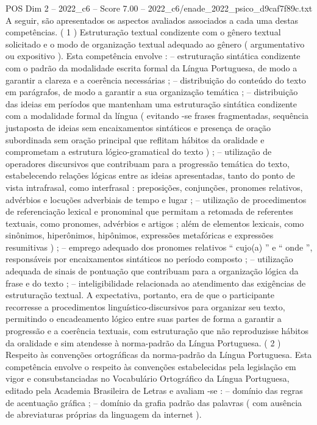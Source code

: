\begin{textsample}{POS Dim 2 – 2022\_c6 – Score 7.00 – 2022\_c6/enade\_2022\_psico\_d9caf7f89c.txt}
A seguir, são apresentados os aspectos avaliados associados a cada uma destas competências. ( 1 ) Estruturação textual condizente com o gênero textual solicitado e o modo de organização textual adequado ao gênero ( argumentativo ou expositivo ).
Esta competência envolve : – estruturação sintática condizente com o padrão da modalidade escrita formal da Língua Portuguesa, de modo a garantir a clareza e a coerência necessárias ; – distribuição do conteúdo do texto em parágrafos, de modo a garantir a sua organização temática ; – distribuição das ideias em períodos que mantenham uma estruturação sintática condizente com a modalidade formal da língua ( evitando -se frases fragmentadas, sequência justaposta de ideias sem encaixamentos sintáticos e presença de oração subordinada sem oração principal que reflitam hábitos da oralidade e comprometam a estrutura lógico-gramatical do texto ) ; – utilização de operadores discursivos que contribuam para a progressão temática do texto, estabelecendo relações lógicas entre as ideias apresentadas, tanto do ponto de vista intrafrasal, como interfrasal : preposições, conjunções, pronomes relativos, advérbios e locuções adverbiais de tempo e lugar ; – utilização de procedimentos de referenciação lexical e pronominal que permitam a retomada de referentes textuais, como pronomes, advérbios e artigos ; além de elementos lexicais, como sinônimos, hiperônimos, hipônimos, expressões metafóricas e expressões resumitivas ) ; – emprego adequado dos pronomes relativos “ cujo(a) ” e “ onde ”, responsáveis por encaixamentos sintáticos no período composto ; – utilização adequada de sinais de pontuação que contribuam para a organização lógica da frase e do texto ; – inteligibilidade relacionada ao atendimento das exigências de estruturação textual.
A expectativa, portanto, era de que o participante recorresse a procedimentos linguístico-discursivos para organizar seu texto, permitindo o encadeamento lógico entre suas partes de forma a garantir a progressão e a coerência textuais, com estruturação que não reproduzisse hábitos da oralidade e sim atendesse à norma-padrão da Língua Portuguesa. ( 2 ) Respeito às convenções ortográficas da norma-padrão da Língua Portuguesa.
Esta competência envolve o respeito às convenções estabelecidas pela legislação em vigor e consubstanciadas no Vocabulário Ortográfico da Língua Portuguesa, editado pela Academia Brasileira de Letras e avaliam -se : – domínio das regras de acentuação gráfica ; – domínio da grafia padrão das palavras ( com ausência de abreviaturas próprias da linguagem da internet ).

\end{textsample}

